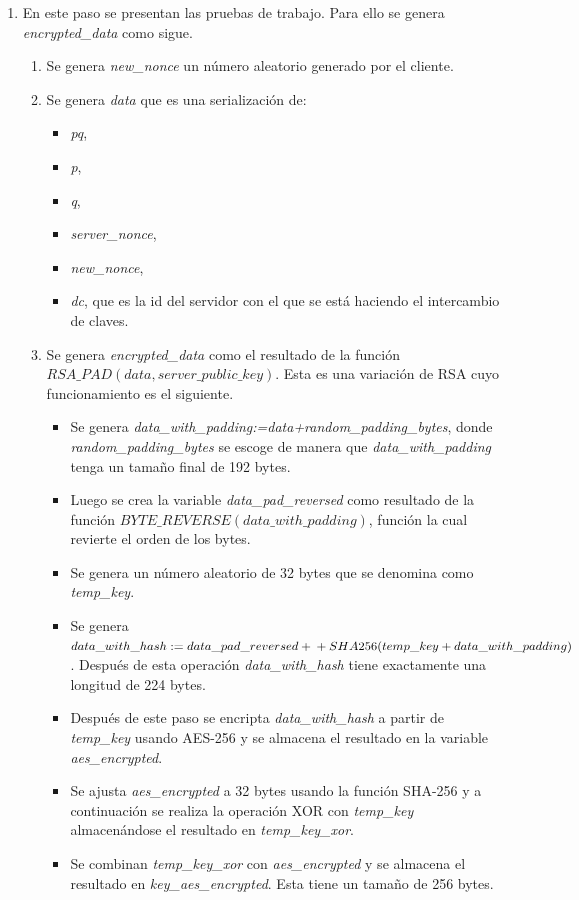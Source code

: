\begin{enumerate}
	\item En este paso se presentan las pruebas de trabajo. Para ello se genera \emph{encrypted\_data} como sigue.
	\begin{enumerate}
		\item Se genera \emph{new\_nonce} un número aleatorio generado por el cliente.
		\item Se genera \emph{data} que es una serialización de:
		\begin{itemize}
			\item \emph{pq},
			\item \emph{p},
			\item \emph{q},
			\item \emph{server\_nonce},
			\item \emph{new\_nonce},
			\item \emph{dc}, que es la id del servidor con el que se está haciendo el intercambio de claves.
		\end{itemize}
		\item Se genera \emph{encrypted\_data} como el resultado de la función $RSA\_PAD(data, server\_public\_key)$. Esta es una variación de RSA cuyo funcionamiento es el siguiente.
		\begin{itemize}
			\item Se genera \emph{data\_with\_padding:=data+random\_padding\_bytes}, donde \emph{random\_padding\_bytes} se escoge de manera que \emph{data\_with\_padding} tenga un tamaño final de 192 bytes.
			\item Luego se crea la variable \emph{data\_pad\_reversed} como resultado de la función $BYTE\_REVERSE(data\_with\_padding)$, función la cual revierte el orden de los bytes.
			\item Se genera un número aleatorio de 32 bytes que se denomina como \emph{temp\_key}.
	\item Se genera $data\_with\_hash:=data\_pad\_reversed + \\ + SHA256(temp\_key + data\_with\_padding)$. Después de esta operación \emph{data\_with\_hash} tiene exactamente una longitud de 224 bytes.
	\item Después de este paso se encripta \emph{data\_with\_hash} a partir de \emph{temp\_key} usando AES-256 y se almacena el resultado en la variable \emph{aes\_encrypted}.
	\item Se ajusta \emph{aes\_encrypted} a 32 bytes usando la función SHA-256 y a continuación se realiza la operación XOR con \emph{temp\_key} almacenándose el resultado en \emph{temp\_key\_xor}.
	\item Se combinan \emph{temp\_key\_xor} con \emph{aes\_encrypted} y se almacena el resultado en \emph{key\_aes\_encrypted}. Esta tiene un tamaño de 256 bytes. 

\end{itemize}
\end{enumerate}
\end{enumerate}
